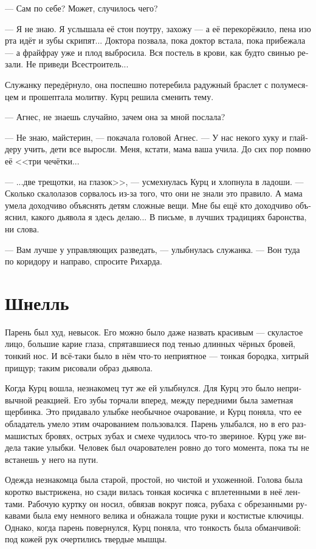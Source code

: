 \documentclass[a4paper,12pt,fleqn]{book}\usepackage{polyglossia}\setdefaultlanguage[babelshorthands=true]{russian}\setotherlanguage{english}\defaultfontfeatures{Ligatures=TeX,Mapping=tex-text}\usepackage{xcolor}\newcommand{\ml}[3]{#2}
\begin{document}
--- Сам по себе?
\ml{$0$}
{Может, случилось чего?}
{Maybe, something's happened?''}

--- Я не знаю.
Я услышала её стон поутру, захожу --- а её перекорёжило, пена изо рта идёт и зубы скрипят...
Доктора позвала, пока доктор встала, пока прибежала --- а фрайфрау уже и плод выбросила.
Вся постель в крови, как будто свинью резали.
Не приведи Всестроитель...

Служанку передёрнуло, она поспешно потеребила радужный браслет с полумесяцем и прошептала молитву.
Курц решила сменить тему.

--- Агнес, не знаешь случайно, зачем она за мной послала?

--- Не знаю, майстерин, --- покачала головой Агнес.
--- У нас некого хуку и глайдеру учить, дети все выросли.
Меня, кстати, мама ваша учила.
До сих пор помню её <<три чечётки...

--- ...две трещотки, на глазок>>, --- усмехнулась Курц и хлопнула в ладоши.
--- Сколько скалолазов сорвалось из-за того, что они не знали это правило.
А мама умела доходчиво объяснять детям сложные вещи.
Мне бы ещё кто доходчиво объяснил, какого дьявола я здесь делаю...
В письме, в лучших традициях баронства, ни слова.

--- Вам лучше у управляющих разведать, --- улыбнулась служанка.
--- Вон туда по коридору и направо, спросите Рихарда.

\section{Шнелль}

Парень был худ, невысок.
Его можно было даже назвать красивым --- скуластое лицо, большие карие глаза, спрятавшиеся под тенью длинных чёрных бровей, тонкий нос.
И всё-таки было в нём что-то неприятное --- тонкая бородка, хитрый прищур;
таким рисовали образ дьявола.

Когда Курц вошла, незнакомец тут же ей улыбнулся.
Для Курц это было непривычной реакцией.
Его зубы торчали вперед, между передними была заметная щербинка.
Это придавало улыбке необычное очарование, и Курц поняла, что ее обладатель умело этим очарованием пользовался.
Парень улыбался, но в его размашистых бровях, острых зубах и смехе чудилось что-то звериное.
Курц уже видела такие улыбки.
Человек был очарователен ровно до того момента, пока ты не встанешь у него на пути.

Одежда незнакомца была старой, простой, но чистой и ухоженной.
Голова была коротко выстрижена, но сзади вилась тонкая косичка с вплетенными в неё лентами.
Рабочую куртку он носил, обвязав вокруг пояса, рубаха с обрезанными рукавами была ему немного велика и обнажала тощие руки и костистые ключицы.
Однако, когда парень повернулся, Курц поняла, что тонкость была обманчивой: под кожей рук очертились твердые мышцы. 
\end{document}
